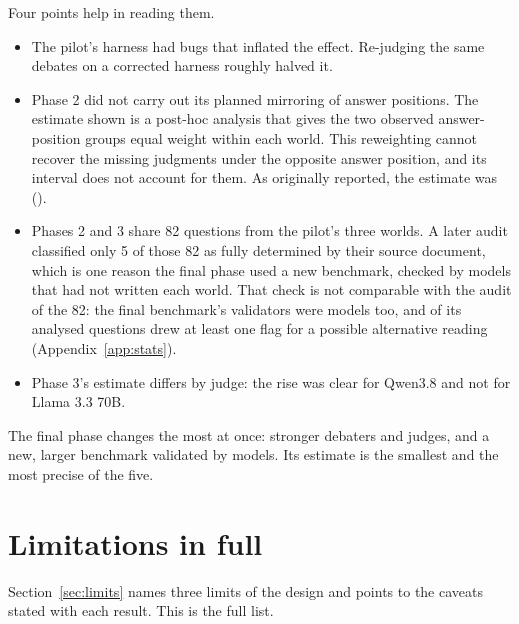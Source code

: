\begin{table}[h]
\centering
\caption{The phases behind Figure~\ref{fig:phases}. The rise in error is in percentage points with a 95\% interval.}
\label{tab:phases}
\footnotesize
\setlength{\tabcolsep}{3.5pt}

\end{table}

Four points help in reading them.

\begin{itemize}[leftmargin=1.4em,itemsep=1pt,topsep=2pt]
\item The pilot's harness had bugs that inflated the effect. Re-judging the same debates on a corrected harness
roughly halved it.
\item Phase 2 did not carry out its planned mirroring of answer positions. The estimate shown is a post-hoc analysis
that gives the two observed answer-position groups equal weight within each world. This reweighting cannot recover
the missing judgments under the opposite answer position, and its interval does not account for them. As originally
reported, the estimate was \phaseTwoAsRun{} \pp{} (\phaseTwoAsRunCI).
\item Phases 2 and 3 share 82 questions from the pilot's three worlds. A later audit classified only 5 of those 82
as fully determined by their source document, which is one reason the final phase used a new benchmark, checked by
models that had not written each world. That check is not comparable with the audit of the 82: the final
benchmark's validators were models too, and \nFlaggedAny{} of its \nCounted{} analysed questions drew at least one
flag for a possible alternative reading (Appendix~\ref{app:stats}).
\item Phase 3's estimate differs by judge: the rise was clear for Qwen3.8 and not for Llama 3.3 70B.
\end{itemize}

The final phase changes the most at once: stronger debaters and judges, and a new, larger benchmark validated by
models. Its estimate is the smallest and the most precise of the five.

\section{Limitations in full}
\label{app:limits}

Section~\ref{sec:limits} names three limits of the design and points to the caveats stated with each result. This is
the full list.

